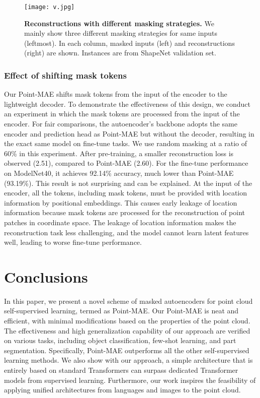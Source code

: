 \documentclass[runningheads]{llncs}
\begin{document}
\begin{figure}
    \centering
    \texttt{[image: v.jpg]}
    \caption{{\bf Reconstructions with different masking strategies.} We mainly show three different masking strategies for same inputs (leftmost). In each column, masked inputs (left) and reconstructions (right) are shown. Instances are from ShapeNet validation set.}
    \label{fig:mask}
\end{figure}

\subsubsection{Effect of shifting mask tokens}

Our Point-MAE shifts mask tokens from the input of the encoder to the lightweight decoder. To demonstrate the effectiveness of this design, we conduct an experiment in which the mask tokens are processed from the input of the encoder. For fair comparisons, the autoencoder's backbone adopts the same encoder and prediction head as Point-MAE but without the decoder, resulting in the exact same model on fine-tune tasks. We use random masking at a ratio of 60\% in this experiment. After pre-training, a smaller reconstruction loss is observed (2.51), compared to Point-MAE (2.60). For the fine-tune performance on ModelNet40, it achieves 92.14\% accuracy, much lower than Point-MAE (93.19\%). This result is not surprising and can be explained. At the input of the encoder, all the tokens, including mask tokens, must be provided with location information by positional embeddings. This causes early leakage of location information because mask tokens are processed for the reconstruction of point patches in coordinate space. The leakage of location information makes the reconstruction task less challenging, and the model cannot learn latent features well, leading to worse fine-tune performance.


\section{Conclusions}

In this paper, we present a novel scheme of masked autoencoders for point cloud self-supervised learning, termed as Point-MAE. Our Point-MAE is neat and efficient, with minimal modifications based on the properties of the point cloud. The effectiveness and high generalization capability of our approach are verified on various tasks, including object classification, few-shot learning, and part segmentation. Specifically, Point-MAE outperforms all the other self-supervised learning methods. We also show with our approach, a simple architecture that is entirely based on standard Transformers can surpass dedicated Transformer models from supervised learning. Furthermore, our work inspires the feasibility of applying unified architectures from languages and images to the point cloud.



\end{document}
